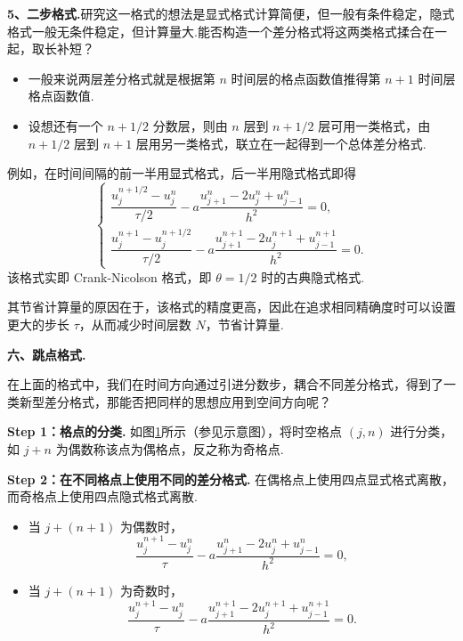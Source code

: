 \noindent\textbf{5、二步格式.}研究这一格式的想法是显式格式计算简便，但一般有条件稳定，隐式格式一般无条件稳定，但计算量大.能否构造一个差分格式将这两类格式揉合在一起，取长补短？

\begin{note}[创新思想]
    \begin{itemize}
        \item 一般来说两层差分格式就是根据第 $n$ 时间层的格点函数值推得第 $n+1$ 时间层格点函数值.
        \item 设想还有一个 $n+1/2$ 分数层，则由 $n$ 层到 $n+1/2$ 层可用一类格式，由 $n+1/2$ 层到 $n+1$ 层用另一类格式，联立在一起得到一个总体差分格式.
    \end{itemize}
\end{note}


    例如，在时间间隔的前一半用显式格式，后一半用隐式格式即得
    \begin{equation*}
        \begin{cases}
            \dfrac{u_j^{n+1/2} - u_j^n}{\tau/2} - a \dfrac{u_{j+1}^n - 2u_j^n + u_{j-1}^n}{h^2} = 0, \\
            \dfrac{u_j^{n+1} - u_j^{n+1/2}}{\tau/2} - a \dfrac{u_{j+1}^{n+1} - 2u_j^{n+1} + u_{j-1}^{n+1}}{h^2} = 0.
        \end{cases}
    \end{equation*}
    该格式实即 Crank-Nicolson 格式，即 $\theta = 1/2$ 时的古典隐式格式.\par
    其节省计算量的原因在于，该格式的精度更高，因此在追求相同精确度时可以设置更大的步长 $\tau$，从而减少时间层数 $N$，节省计算量.

\noindent\textbf{六、跳点格式.}
    
在上面的格式中，我们在时间方向通过引进分数步，耦合不同差分格式，得到了一类新型差分格式，那能否把同样的思想应用到空间方向呢？

\noindent\textbf{Step 1：格点的分类.} 如图\ref{fig:跳点格式}所示（参见示意图），将时空格点 $(j,n)$ 进行分类，如 $j+n$ 为偶数称该点为偶格点，反之称为奇格点.

\begin{figure}[H]
    \centering
    
    \label{fig:跳点格式}
\end{figure}

\noindent\textbf{Step 2：在不同格点上使用不同的差分格式.} 在偶格点上使用四点显式格式离散，而奇格点上使用四点隐式格式离散.
    \begin{itemize}
        \item 当 $j+(n+1)$ 为偶数时，
        \begin{equation}\label{eq:4.6}
            \frac{u_j^{n+1}-u_j^n}{\tau}-a\frac{u_{j+1}^n-2u_j^n+u_{j-1}^n}{h^2}=0,
        \end{equation}
        \item 当 $j+(n+1)$ 为奇数时，
        \begin{equation}\label{eq:4.7}
            \frac{u_j^{n+1}-u_j^n}{\tau}-a\frac{u_{j+1}^{n+1}-2u_j^{n+1}+u_{j-1}^{n+1}}{h^2}=0.
        \end{equation}
    \end{itemize}

